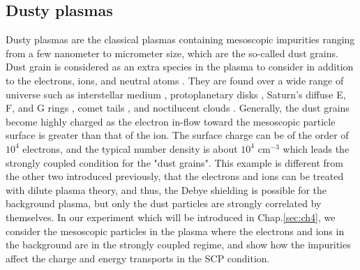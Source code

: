 \subsection{Dusty plasmas}
\label{sec:ch3-3-3}

Dusty plasmas are the classical plasmas containing mesoscopic impurities ranging from a few nanometer to micrometer size, which are the so-called dust grains. Dust grain is considered as an extra species in the plasma to consider in addition to the electrons, ions, and neutral atoms \cite{bellan2008fundamentals}. They are found over a wide range of universe such as interstellar medium \cite{zubko2004interstellar}, protoplanetary disks \cite{pollack1994composition, mcclure2012probing}, Saturn's diffuse E, F, and G rings \cite{goertz1989dusty}, comet tails \cite{davies1997detection}, and noctilucent clouds \cite{havnes1996first}. Generally, the dust grains become highly charged as the electron in-flow toward the mesoscopic particle surface is greater than that of the ion. The surface charge can be of the order of $10^4$ electrons, and the typical number density is about $10^4 \text{ cm}^{-3}$ which leads the strongly coupled condition for the "dust grains". This example is different from the other two introduced previously, that the electrons and ions can be treated with dilute plasma theory, and thus, the Debye shielding is possible for the background plasma, but only the dust particles are strongly correlated by themselves. In our experiment which will be introduced in Chap.\ref{sec:ch4}, we consider the mesoscopic particles in the plasma where the electrons and ions in the background are in the strongly coupled regime, and show how the impurities affect the charge and energy transports in the SCP condition.
